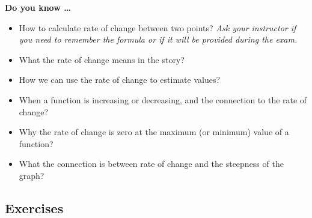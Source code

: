 
 

\noindent \textbf{Do you know \ldots}

\begin{itemize}
\item How to calculate rate of change between two points?   \emph{Ask your instructor if you need to remember the formula or if it will be provided during the exam.} 
\item What the rate of change means in the story?   
\item How we can use the rate of change to estimate values?   
\item When a function is increasing or decreasing, and the connection to the rate of change?   
\item Why the rate of change is zero at the maximum (or minimum) value of a function?   
\item What the connection is between rate of change and the steepness of the graph?   
 
\end{itemize}

\subsection*{Exercises}

